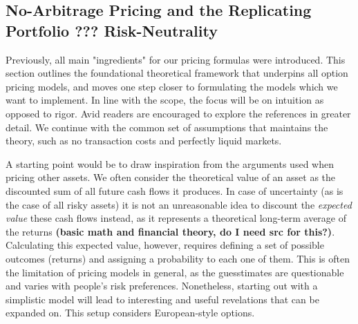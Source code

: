 \documentclass[english,12pt,a4paper,pdftex,sci,utf8]{aaltothesis}
\begin{document}
\subsection{No-Arbitrage Pricing and the Replicating Portfolio ??? Risk-Neutrality}
Previously, all main "ingredients" for our pricing formulas were introduced. This section outlines the foundational theoretical framework that underpins all option pricing models, and moves one step closer to formulating the models which we want to implement. In line with the scope, the focus will be on intuition as opposed to rigor. Avid readers are encouraged to explore the references in greater detail. We continue with the common set of assumptions that maintains the theory, such as no transaction costs and perfectly liquid markets.

A starting point would be to draw inspiration from the arguments used when pricing other assets. We often consider the theoretical value of an asset as the discounted sum of all future cash flows it produces. In case of uncertainty (as is the case of all risky assets) it is not an unreasonable idea to discount the \emph{expected value} these cash flows instead, as it represents a theoretical long-term average of the returns \textbf{(basic math and financial theory, do I need src for this?)}. Calculating this expected value, however, requires defining a set of possible outcomes (returns) and assigning a probability to each one of them. This is often the limitation of pricing models in general, as the guesstimates are questionable and varies with people's risk preferences. Nonetheless, starting out with a simplistic model will lead to interesting and useful revelations that can be expanded on. This setup considers European-style options.
\end{document}
